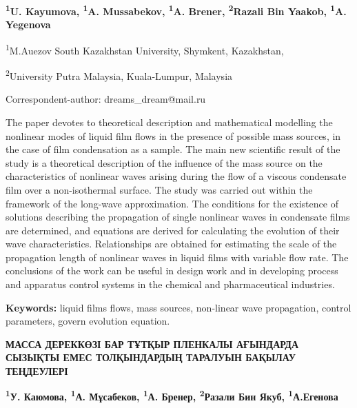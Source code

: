 
\begin{articleheader}

{\bfseries
\textsuperscript{1}U. Kayumova\textsuperscript{\envelope },
\textsuperscript{1}A. Mussabekov,
\textsuperscript{1}A. Brener,
\textsuperscript{2}Razali Bin Yaakob,
\textsuperscript{1}A. Yegenova
}
\end{articleheader}

\begin{affiliation}
\textsuperscript{1}M.Auezov South Kazakhstan University, Shymkent, Kazakhstan,

\textsuperscript{2}University Putra Malaysia, Kuala-Lumpur, Malaysia

\raggedright \textsuperscript{\envelope }Correspondent-author: dreams\_dream@mail.ru
\end{affiliation}

The paper devotes to theoretical description and mathematical modelling
the nonlinear modes of liquid film flows in the presence of possible
mass sources, in the case of film condensation as a sample. The main new
scientific result of the study is a theoretical description of the
influence of the mass source on the characteristics of nonlinear waves
arising during the flow of a viscous condensate film over a
non-isothermal surface. The study was carried out within the framework
of the long-wave approximation. The conditions for the existence of
solutions describing the propagation of single nonlinear waves in
condensate films are determined, and equations are derived for
calculating the evolution of their wave characteristics. Relationships
are obtained for estimating the scale of the propagation length of
nonlinear waves in liquid films with variable flow rate. The conclusions
of the work can be useful in design work and in developing process and
apparatus control systems in the chemical and pharmaceutical industries.

{\bfseries Keywords:} liquid films flows, mass sources, non-linear wave
propagation, control parameters, govern evolution equation.

\begin{articleheader}
{\bfseries МАССА ДЕРЕККӨЗІ БАР ТҰТҚЫР ПЛЕНКАЛЫ АҒЫНДАРДА СЫЗЫҚТЫ ЕМЕС
ТОЛҚЫНДАРДЫҢ ТАРАЛУЫН БАҚЫЛАУ ТЕҢДЕУЛЕРІ}

{\bfseries
\textsuperscript{1}У. Каюмова\textsuperscript{\envelope },
\textsuperscript{1}А. Мұсабеков,
\textsuperscript{1}А. Бренер,
\textsuperscript{2}Разали Бин Якуб,
\textsuperscript{1}А.Егенова
}
\end{articleheader}

